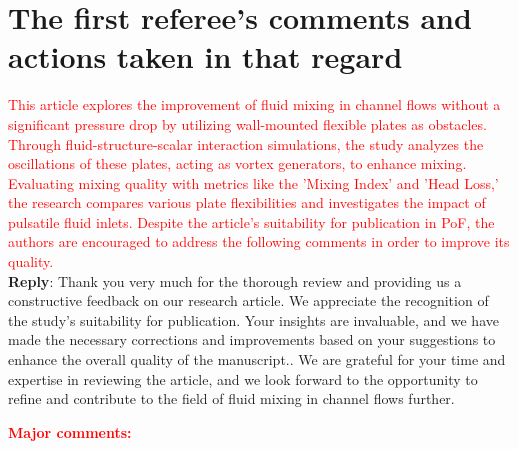 \documentclass[onecolumn,a4paper,amsmath,amssym,pre]{revtex4}
\begin{document}
				\section*{\textbf{The first referee's comments and actions taken in that regard}}   
				
				\textcolor{red}{This article explores the improvement of fluid mixing in channel flows without a significant pressure drop by utilizing wall-mounted flexible plates as obstacles. Through fluid-structure-scalar interaction simulations, the study analyzes the oscillations of these plates, acting as vortex generators, to	enhance mixing. Evaluating mixing quality with metrics like the ’Mixing Index’ and ’Head Loss,’ the research compares various plate flexibilities and investigates the impact of pulsatile fluid inlets. Despite the article’s suitability for publication in PoF, the authors are encouraged to address the following comments in order to improve its quality.}\\
				
				\textbf{Reply}: Thank you very much for the thorough review and providing us a constructive feedback on our research article. We appreciate the recognition of the study's suitability for publication.  Your insights are invaluable, and we have made the necessary corrections and improvements based on your suggestions to enhance the overall quality of the manuscript.. We are grateful for your time and expertise in reviewing the article, and we look forward to the opportunity to refine and contribute to the field of fluid mixing in channel flows further.\\
				\par\null\par
				\textcolor{red}{\textbf{Major comments:}}
				
\end{document}
